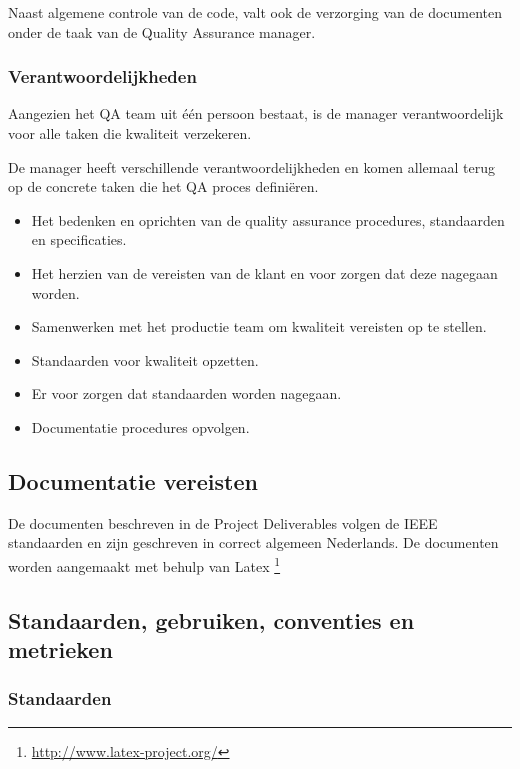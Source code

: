 Naast algemene controle van de code, valt ook de verzorging van de documenten onder de taak van de Quality Assurance manager.

\subsubsection{Verantwoordelijkheden}

Aangezien het QA team uit één persoon bestaat, is de manager verantwoordelijk voor alle taken die kwaliteit verzekeren.

De manager heeft verschillende verantwoordelijkheden en komen allemaal terug op de concrete taken die het QA proces definiëren.

\begin{itemize}

\item Het bedenken en oprichten van de quality assurance procedures, standaarden en specificaties.

\item Het herzien van de vereisten van de klant en voor zorgen dat deze nagegaan worden.

\item Samenwerken met het productie team om kwaliteit vereisten op te stellen.

\item Standaarden voor kwaliteit opzetten.

\item Er voor zorgen dat standaarden worden nagegaan.

\item Documentatie procedures opvolgen.
\end{itemize}

\subsection{Documentatie vereisten}

De documenten beschreven in de Project Deliverables volgen de IEEE standaarden en zijn geschreven in correct algemeen Nederlands. De documenten worden aangemaakt met behulp van Latex \footnote{\url{http://www.latex-project.org/}}

\subsection{Standaarden, gebruiken, conventies en metrieken}

\subsubsection {Standaarden}

